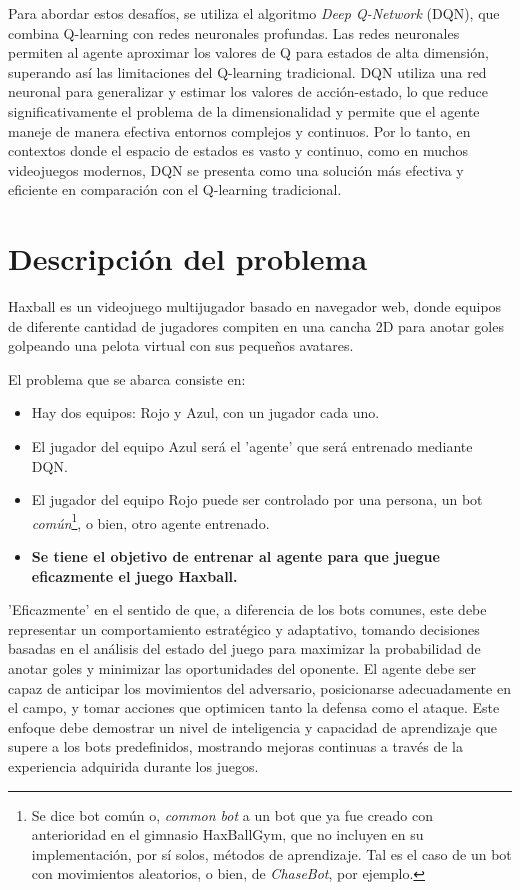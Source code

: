 \documentclass[10pt]{article}
\begin{document}
Para abordar estos desafíos, se utiliza el algoritmo \textit{Deep Q-Network} (DQN), que combina Q-learning con redes neuronales profundas. Las redes neuronales permiten al agente aproximar los valores de Q para estados de alta dimensión, superando así las limitaciones del Q-learning tradicional. DQN utiliza una red neuronal para generalizar y estimar los valores de acción-estado, lo que reduce significativamente el problema de la dimensionalidad y permite que el agente maneje de manera efectiva entornos complejos y continuos. Por lo tanto, en contextos donde el espacio de estados es vasto y continuo, como en muchos videojuegos modernos, DQN se presenta como una solución más efectiva y eficiente en comparación con el Q-learning tradicional.

\section{Descripción del problema}

Haxball es un videojuego multijugador basado en navegador web, donde equipos de diferente cantidad de jugadores compiten en una cancha 2D para anotar goles golpeando una pelota virtual con sus pequeños avatares.

El problema que se abarca consiste en:

\begin{itemize}
	\item Hay dos equipos: Rojo y Azul, con un jugador cada uno.
	\item El jugador del equipo Azul será el 'agente' que será entrenado mediante DQN.
	\item El jugador del equipo Rojo puede ser controlado por una persona, un bot \textit{común}\footnote{Se dice bot común o, \textit{common bot} a un bot que ya fue creado con anterioridad en el gimnasio HaxBallGym, que no incluyen en su implementación, por sí solos, métodos de aprendizaje. Tal es el caso de un bot con movimientos aleatorios, o bien, de \textit{ChaseBot}, por ejemplo.}, o bien, otro agente entrenado.
	\item \textbf{Se tiene el objetivo de entrenar al agente para que juegue eficazmente el juego Haxball.}
\end{itemize}

'Eficazmente' en el sentido de que, a diferencia de los bots comunes, este debe representar un comportamiento estratégico y adaptativo, tomando decisiones basadas en el análisis del estado del juego para maximizar la probabilidad de anotar goles y minimizar las oportunidades del oponente. El agente debe ser capaz de anticipar los movimientos del adversario, posicionarse adecuadamente en el campo, y tomar acciones que optimicen tanto la defensa como el ataque. Este enfoque debe demostrar un nivel de inteligencia y capacidad de aprendizaje que supere a los bots predefinidos, mostrando mejoras continuas a través de la experiencia adquirida durante los juegos.
\end{document}
